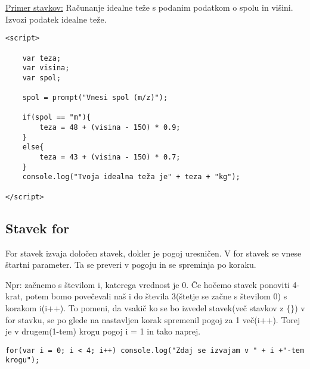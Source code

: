 \underline{Primer stavkov:}
Računanje idealne teže s podanim podatkom o spolu in višini. Izvozi podatek idealne teže.
\begin{verbatim}
<script>

    var teza;
    var visina;
    var spol;

    spol = prompt("Vnesi spol (m/z)");

    if(spol == "m"){
        teza = 48 + (visina - 150) * 0.9;
    }
    else{
        teza = 43 + (visina - 150) * 0.7;    
    }
    console.log("Tvoja idealna teža je" + teza + "kg");
    
</script>
\end{verbatim}

\pagebreak

\subsection{Stavek for}

{\centering{}\par}

For stavek izvaja določen stavek, dokler je pogoj uresničen. V for stavek se vnese štartni parameter. Ta se preveri v pogoju in se spreminja po koraku.

{\centering{}\par}

Npr: začnemo s številom i, katerega vrednost je 0. Če hočemo stavek ponoviti 4-krat, potem bomo povečevali naš i do števila 3(štetje se začne s številom 0) s korakom i(i++). To pomeni, da vsakič ko se bo izvedel stavek(več stavkov z $\{\}$) v for stavku, se po glede na nastavljen korak spremenil pogoj za 1 več(i++). Torej je v drugem(1-tem) krogu pogoj i = 1 in tako naprej.

\begin{verbatim}
for(var i = 0; i < 4; i++) console.log("Zdaj se izvajam v " + i +"-tem krogu");
\end{verbatim}

